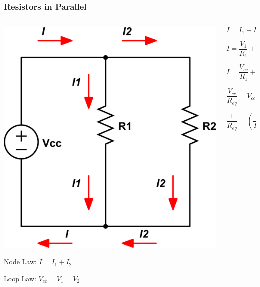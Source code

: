 \documentclass{beamer}
\begin{document}
\begin{frame}\frametitle{Resistors in Parallel}
\begin{columns}
\begin{column}{5cm}
\begin{center}
\includegraphics[scale=0.25]{fig/parallel.png}

\vspace{0.5cm}

Node Law: $I = I_1 + I_2$

\vspace{0.2cm}


Loop Law: $V_{cc} = V_1 = V_2$

\end{center}
\end{column}
\begin{column}{5cm}

\begin{equation}
I = I_1 + I_2
\end{equation}

\begin{equation}
I = \frac{V_1}{R_1} + \frac{V_2}{R_2}
\end{equation}

\begin{equation}
I = \frac{V_{cc}}{R_1} + \frac{V_{cc}}{R_2}
\end{equation}

\begin{equation}
\frac{V_{cc}}{R_{eq}} = V_{cc} (\frac{1}{R_1} + \frac{1}{R_2})
\end{equation}

\begin{equation}
\boxed{\frac{1}{R_{eq}} = (\frac{1}{R_1} + \frac{1}{R_2})}
\end{equation}
\end{column}
\end{columns}
\end{frame}
\end{document}
